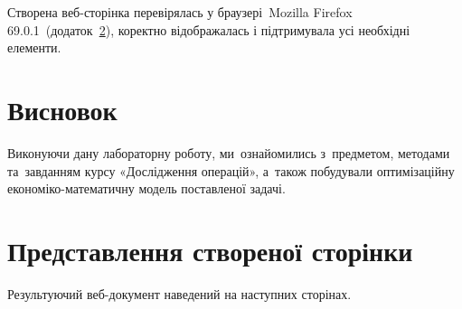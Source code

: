 \documentclass[
  a4paper,
  oneside,
  BCOR = 10mm,
  DIV = 12,
  12pt,
  headings = normal,
]{scrartcl}
\begin{document}
    Створена веб-сторінка перевірялась у браузері~\textenglish{Mozilla Firefox 69.0.1}~(додаток~\ref{sec:result}), коректно відображалась і підтримувала усі необхідні елементи.

  \section{Висновок}
    Виконуючи дану лабораторну роботу, ми~ознайомились з~предметом, методами та~завданням курсу «Дослідження операцій», а~також побудували оптимізаційну економіко-математичну модель поставленої задачі.

  \appendix
  \section{Представлення створеної сторінки}
    \label{sec:result}
    Результуючий веб-документ наведений на наступних сторінах.

    \newpage
    
\end{document}

